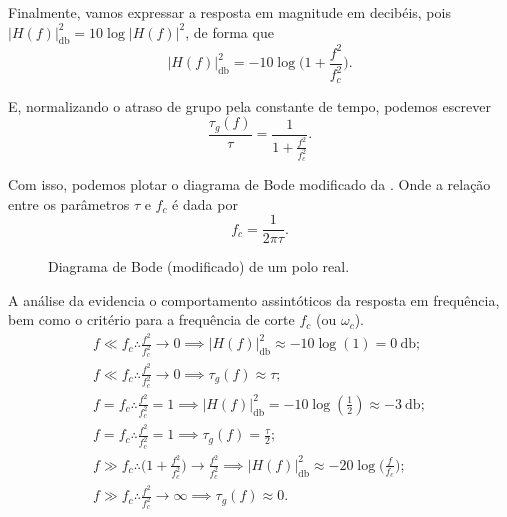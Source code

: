 Finalmente, vamos expressar a resposta em magnitude em decibéis, pois $|H(f)|_{\unit{\decibel}}^2=10\log|H(f)|^2$, de forma que
\begin{equation}
	|H(f)|_{\unit{\decibel}}^2=-10\log\Big(1+\frac{f^2}{f_c^2}\Big).
\end{equation}

E, normalizando o atraso de grupo pela constante de tempo, podemos escrever
\begin{equation}
	\frac{\tau_g(f)}{\tau}=\frac{1}{\displaystyle1+\frac{f^2}{f_c^2}}.
\end{equation}

Com isso, podemos plotar o diagrama de Bode modificado da . Onde a relação entre os parâmetros $\tau$ e $f_c$ é dada por
\begin{equation}
	f_c=\frac{1}{2\pi\tau}.
\end{equation}

\begin{figure}[ht]
	\centering
	\caption{Diagrama de Bode (modificado) de um polo real.}
	\label{fig:poloReal}
\end{figure}

A análise da  evidencia o comportamento assintóticos da resposta em frequência, bem como o critério para a frequência de corte $f_c$ (ou $\omega_c$).
\begin{gather*}
	f\ll f_c\therefore\frac{f^2}{f_c^2}\to0\implies|H(f)|_{\unit{\decibel}}^2\approx-10\log(1)=\qty{0}{\decibel};\\
	f\ll f_c\therefore\frac{f^2}{f_c^2}\to0\implies\tau_g(f)\approx\tau;\\
	f=f_c\therefore\frac{f^2}{f_c^2}=1\implies|H(f)|_{\unit{\decibel}}^2=-10\log(\textstyle\frac{1}{2})\approx\qty{-3}{\decibel};\\
	f=f_c\therefore\frac{f^2}{f_c^2}=1\implies\tau_g(f)=\frac{\tau}{2};\\
	f\gg f_c\therefore\Big(1+\frac{f^2}{f_c^2}\Big)\to\frac{f^2}{f_c^2}\implies|H(f)|_{\unit{\decibel}}^2\approx-20\log\Big(\frac{f}{f_c}\Big);\\
	f\gg f_c\therefore\frac{f^2}{f_c^2}\to\infty\implies\tau_g(f)\approx0.
\end{gather*}

